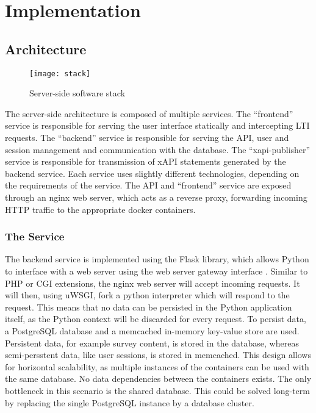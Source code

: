 \section{Implementation}
\label{section:implementation:architecture}
\subsection{Architecture}
    \begin{figure}[H]
        \centering
        \texttt{[image: stack]}
        \caption{Server-side software stack}
        \label{fig:stack}
    \end{figure}

    The server-side architecture is composed of multiple services.
    The ``frontend'' service is responsible for serving the
    user interface statically and intercepting LTI requests.
    The ``backend'' service is responsible for serving the API,
    user and session management and communication with the database.
    The ``xapi-publisher'' service is responsible for transmission
    of xAPI statements generated by the backend service.
    Each service uses slightly different technologies, depending
    on the requirements of the service. The API and ``frontend'' service
    are exposed through an nginx web server, which acts as a reverse
    proxy, forwarding incoming HTTP traffic to the appropriate docker
    containers.

    \subsubsection{The  Service}
        The backend service is implemented using the Flask
        library, which allows Python to interface with a web server
        using the web server gateway interface \cite{pep-333}. Similar
        to PHP or CGI extensions, the nginx web server will accept incoming
        requests. It will then, using uWSGI, fork a python interpreter
        which will respond to the request. This means that no data
        can be persisted in the Python application itself, as the
        Python context will be discarded for every request.
        To persist data, a PostgreSQL database and a memcached
        in-memory key-value store are used.
        Persistent data, for example survey content, is stored
        in the database, whereas semi-persstent data, like user
        sessions, is stored in memcached. This design allows
        for horizontal scalability, as multiple instances of the
         containers can be used with the same database.
        No data dependencies between the  containers
        exists. The only bottleneck in this scenario is the shared database.
        This could be solved long-term by replacing the single PostgreSQL
        instance by a database cluster.

